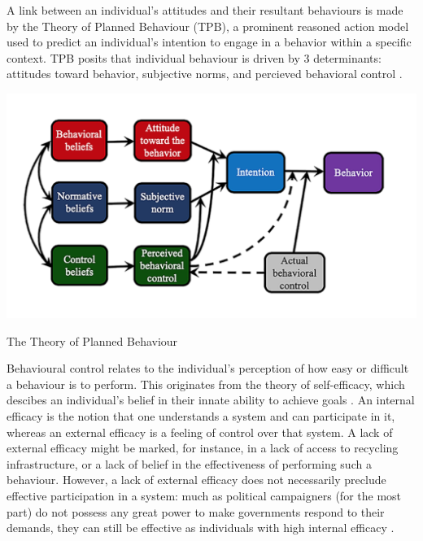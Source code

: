 \documentclass[nofonts,nols,justified,nobib]{tufte-book}
\begin{document}
A link between an individual's attitudes and their resultant behaviours is made by the Theory of Planned Behaviour (TPB), a prominent reasoned action model used to predict an individual's intention to engage in a behavior within a specific context. TPB posits that individual behaviour is driven by 3 determinants: attitudes toward behavior, subjective norms, and percieved behavioral control \cite{ajzen_theory_1991}.

\begin{marginfigure}
\includegraphics[width=\textwidth]{img/1/tpb.png}
\caption{The Theory of Planned Behaviour \cite{ajzen_theory_1991}\label{b}}
\end{marginfigure}

Behavioural control relates to the individual's perception of how easy or difficult a behaviour is to perform. This originates from the theory of self-efficacy, which descibes an individual's belief in their innate ability to achieve goals \cite{bandura_self-efficacy_1982}. An internal efficacy is the notion that one understands a system and can participate in it, whereas an external efficacy is a feeling of control over that system. A lack of external efficacy might be marked, for instance, in a lack of access to recycling infrastructure, or a lack of belief in the effectiveness of performing such a behaviour. However, a lack of external efficacy does not necessarily preclude effective participation in a system: much as political campaigners (for the most part) do not possess any great power to make governments respond to their demands, they can still be effective as individuals with high internal efficacy \cite{zuckerman_mobilizing_2019}.

\end{document}
